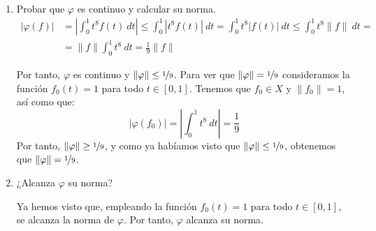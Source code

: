\documentclass[12pt]{article}
\begin{document}
\begin{ejercicio}
\begin{enumerate}[label=(\alph*)]
            \item Probar que $\varphi$ es continuo y calcular su norma.            
            \begin{align*}
                |\varphi(f)| &= \left|\int_{0}^{1} t^8 f(t)~dt\right| \leq \int_{0}^{1} |t^8 f(t)|~dt = \int_{0}^{1} t^8 |f(t)|~dt \leq \int_{0}^{1} t^8 \|f\|~dt =\\&= \|f\|\int_{0}^{1} t^8~dt = \frac{1}{9}\|f\|
            \end{align*}

            Por tanto, $\varphi$ es continuo y $\|\varphi\|\leq \nicefrac{1}{9}$. Para ver que $\|\varphi\| = \nicefrac{1}{9}$ consideramos la función $f_0(t) = 1$ para todo $t\in [0,1]$. Tenemos que $f_0\in X$ y $\|f_0\| = 1$, así como que:
            \begin{equation*}
                |\varphi(f_0)| = \left|\int_{0}^{1} t^8~dt\right| = \frac{1}{9}
            \end{equation*}
            Por tanto, $\|\varphi\| \geq \nicefrac{1}{9}$, y como ya habíamos visto que $\|\varphi\|\leq \nicefrac{1}{9}$, obtenemos que $\|\varphi\| = \nicefrac{1}{9}$.
            \item ¿Alcanza $\varphi$ su norma?
            
            Ya hemos visto que, empleando la función $f_0(t) = 1$ para todo $t\in [0,1]$, se alcanza la norma de $\varphi$. Por tanto, $\varphi$ alcanza su norma.
        \end{enumerate}
    \end{ejercicio}
\end{document}
